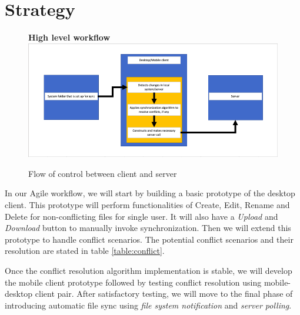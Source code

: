 \documentclass[a4paper]{article}
\begin{document}
{\section{Strategy}
\begin{figure}[H]
	\centering
	\textbf{High level workflow}
	\includegraphics[width=\linewidth]{images/1.png}
	\caption{Flow of control between client and server}
\end{figure}\par
In our Agile workflow, we will start by building a basic prototype of the desktop client. This prototype will perform functionalities of Create, Edit, Rename and Delete for non-conflicting files for single user. It will also have a \emph{Upload} and \emph{Download} button to manually invoke synchronization. Then we will extend this prototype to handle conflict scenarios. The potential conflict scenarios and their resolution are stated in table \ref{table:conflict}.

Once the conflict resolution algorithm implementation is stable, we will develop the mobile client prototype followed by testing conflict resolution using mobile-desktop client pair. After satisfactory testing, we will move to the final phase of introducing automatic file sync using \emph{file system notification} and \emph{server polling}.

}
\end{document}
